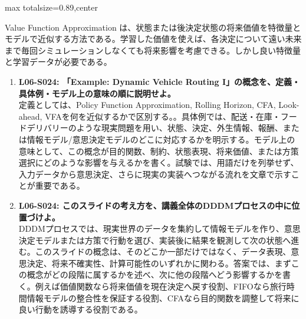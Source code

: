 \begin{minipage}[t]{0.58\textwidth}
\begin{adjustbox}{max totalsize={\textwidth}{0.89\textheight},center}
\begin{minipage}{\textwidth}
Value Function Approximation は、状態または後決定状態の将来価値を特徴量とモデルで近似する方法である。学習した価値を使えば、各決定について遠い未来まで毎回シミュレーションしなくても将来影響を考慮できる。しかし良い特徴量と学習データが必要である。\par{}\begin{enumerate}\item \textbf{L06-S024: 「Example: Dynamic Vehicle Routing I」の概念を、定義・具体例・モデル上の意味の順に説明せよ。}\\定義としては、Policy Function Approximation, Rolling Horizon, CFA, Look-ahead, VFAを何を近似するかで区別する。。具体例では、配送・在庫・フードデリバリーのような現実問題を用い、状態、決定、外生情報、報酬、または情報モデル/意思決定モデルのどこに対応するかを明示する。モデル上の意味として、この概念が目的関数、制約、状態表現、将来価値、または方策選択にどのような影響を与えるかを書く。試験では、用語だけを列挙せず、入力データから意思決定、さらに現実の実装へつながる流れを文章で示すことが重要である。\item \textbf{L06-S024: このスライドの考え方を、講義全体のDDDMプロセスの中に位置づけよ。}\\DDDMプロセスでは、現実世界のデータを集約して情報モデルを作り、意思決定モデルまたは方策で行動を選び、実装後に結果を観測して次の状態へ進む。このスライドの概念は、そのどこか一部だけではなく、データ表現、意思決定、将来不確実性、計算可能性のいずれかに関わる。答案では、まずこの概念がどの段階に属するかを述べ、次に他の段階へどう影響するかを書く。例えば価値関数なら将来価値を現在決定へ戻す役割、FIFOなら旅行時間情報モデルの整合性を保証する役割、CFAなら目的関数を調整して将来に良い行動を誘導する役割である。\end{enumerate}
\end{minipage}
\end{adjustbox}
\end{minipage}


